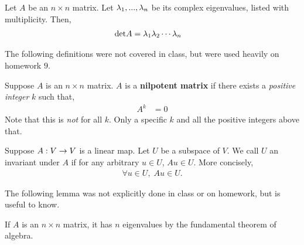 \begin{lemma}
    Let $A$ be an $n \times n$ matrix. Let $\lambda_1, ..., \lambda_n$ be its complex eigenvalues, listed with multiplicity. Then,
    \begin{align*}
        \text{det} A &= \lambda_1 \lambda_2 \cdots \lambda_n
    \end{align*}
\end{lemma}

The following definitions were not covered in class, but were used heavily on homework $9$.
\begin{definition}
    Suppose $A$ is an $n \times n$ matrix. $A$ is a \textbf{nilpotent matrix} if there exists a \emph{positive integer} $k$ such that,
    \begin{align*}
        A^k &= 0
    \end{align*}
    Note that this is \emph{not} for all $k$. Only a specific $k$ and all the positive integers above that.
\end{definition}

\begin{definition}
    Suppose $A : V \rightarrow V$ is a linear map. Let $U$ be a subspace of $V$. We call $U$ an invariant under $A$ if for any arbitrary $u \in U$, 
    $Au \in U$. More concisely,
    \begin{align*}
        \forall u \in U, \; Au \in U.
    \end{align*}
\end{definition}

\noindent The following lemma was not explicitly done in class or on homework, but is useful to know.
\begin{lemma}
    If $A$ is an $n \times n$ matrix, it has $n$ eigenvalues by the fundamental theorem of algebra.
\end{lemma} 

